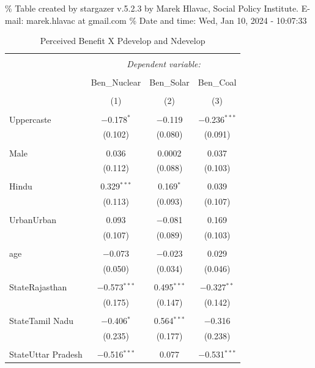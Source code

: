 \documentclass[
]{article}
\begin{document}
\renewcommand{\arraystretch}{0.7}

\% Table created by stargazer v.5.2.3 by Marek Hlavac, Social Policy
Institute. E-mail: marek.hlavac at gmail.com \% Date and time: Wed, Jan
10, 2024 - 10:07:33

\begin{table}[!htbp] \centering 
  \caption{Perceived Benefit X Pdevelop and Ndevelop} 
  \label{} 
\begin{tabular}{@{\extracolsep{5pt}}lccc} 
\\[-1.8ex]\hline 
\hline \\[-1.8ex] 
 & \multicolumn{3}{c}{\textit{Dependent variable:}} \\ 
\cline{2-4} 
\\[-1.8ex] & Ben\_Nuclear & Ben\_Solar & Ben\_Coal \\ 
\\[-1.8ex] & (1) & (2) & (3)\\ 
\hline \\[-1.8ex] 
 Uppercaste & $-$0.178$^{*}$ & $-$0.119 & $-$0.236$^{***}$ \\ 
  & (0.102) & (0.080) & (0.091) \\ 
  & & & \\ 
 Male & 0.036 & 0.0002 & 0.037 \\ 
  & (0.112) & (0.088) & (0.103) \\ 
  & & & \\ 
 Hindu & 0.329$^{***}$ & 0.169$^{*}$ & 0.039 \\ 
  & (0.113) & (0.093) & (0.107) \\ 
  & & & \\ 
 UrbanUrban & 0.093 & $-$0.081 & 0.169 \\ 
  & (0.107) & (0.089) & (0.103) \\ 
  & & & \\ 
 age & $-$0.073 & $-$0.023 & 0.029 \\ 
  & (0.050) & (0.034) & (0.046) \\ 
  & & & \\ 
 StateRajasthan & $-$0.573$^{***}$ & 0.495$^{***}$ & $-$0.327$^{**}$ \\ 
  & (0.175) & (0.147) & (0.142) \\ 
  & & & \\ 
 StateTamil Nadu & $-$0.406$^{*}$ & 0.564$^{***}$ & $-$0.316 \\ 
  & (0.235) & (0.177) & (0.238) \\ 
  & & & \\ 
 StateUttar Pradesh & $-$0.516$^{***}$ & 0.077 & $-$0.531$^{***}$ \\ 

\end{tabular}
\end{table}
\end{document}
